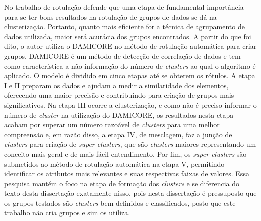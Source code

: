 No trabalho de rotulação  defende que uma etapa de fundamental importância para se ter bons resultados na rotulação de grupos de dados se dá na clusterização. Portanto, quanto mais eficiente for a técnica de agrupamento de dados utilizada, maior será acurácia dos grupos encontrados. A partir do que foi dito, o autor utiliza o DAMICORE no método de rotulação automática para criar grupos. DAMICORE é um método de detecção de correlação de dados e tem como característica a não informação do número de \textit{clusters} ao qual o algoritmo é aplicado. O modelo é dividido em cinco etapas até se obterem os rótulos. A etapa I e II preparam os dados e ajudam a medir a similaridade dos elementos, oferecendo uma maior precisão e contribuindo para criação de grupos mais significativos. Na etapa III ocorre a clusterização, e como não é preciso informar o número de \textit{cluster} na utilização do DAMICORE, os resultados nesta etapa acabam por superar um número razoável de \textit{clusters} para uma melhor compreensão e, em razão disso, a etapa IV, de mesclagem, faz a junção de \textit{clusters} para criação de \textit{super-clusters}, que são \textit{clusters} maiores representando um conceito mais geral e de mais fácil entendimento. Por fim, os \textit{super-clusters} são submetidos ao método de rotulação automática na etapa V, permitindo identificar os atributos mais relevantes e suas respectivas faixas de valores. Essa pesquisa mantém o foco na etapa de formação dos \textit{clusters} e se diferencia do texto desta dissertação exatamente nisso, pois nesta dissertação é pressuposto que os grupos testados são \textit{clusters} bem definidos e classificados, posto que este trabalho não cria grupos e sim os utiliza. 

